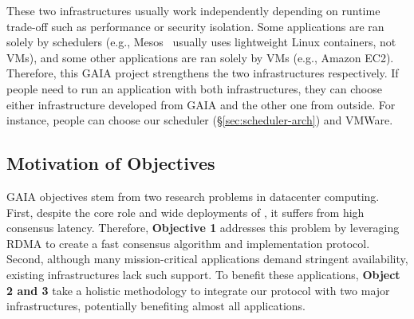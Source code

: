 These two infrastructures usually work independently depending on 
runtime trade-off such as performance or security isolation. Some applications 
are ran solely by schedulers (e.g., Mesos~\cite{mesos:nsdi11} usually uses 
lightweight Linux containers, not VMs), and some other applications are ran 
solely by VMs (e.g., Amazon EC2). Therefore, this GAIA project strengthens the 
two infrastructures respectively. If people need to run an application with 
both infrastructures, they can choose either infrastructure developed from 
GAIA and the other one from outside. For instance, people can choose our 
\tripod scheduler (\S\ref{sec:scheduler-arch}) and VMWare.





% 




\vspace{-.15in}\subsection{Motivation of Objectives} 
\label{sec:motivation}\vspace{-.075in}

GAIA objectives stem from two research problems in datacenter 
computing. First, despite the core role and wide deployments of \paxos, it 
suffers from high consensus latency. Therefore, 
\textbf{Objective 1} addresses this problem by leveraging RDMA to create a 
fast consensus algorithm and implementation protocol. Second, although many 
mission-critical applications demand stringent availability, existing 
infrastructures lack such support. To benefit these applications, 
\textbf{Object 2 and 3} take a holistic methodology to integrate our protocol 
with two major infrastructures, potentially benefiting almost all applications.



